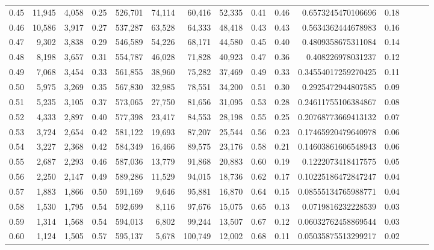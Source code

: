 \begin{tabular}{rrrrrrrrrrrrrrr}
0.45 &  11,945 &  4,058 &  0.25 &  526,701 &   74,114 &   60,416 &   52,335 &  0.41 &  0.46 &      0.6573245470106696 &      0.18 \\
0.46 &  10,586 &  3,917 &  0.27 &  537,287 &   63,528 &   64,333 &   48,418 &  0.43 &  0.43 &      0.5634362444678983 &      0.16 \\
0.47 &   9,302 &  3,838 &  0.29 &  546,589 &   54,226 &   68,171 &   44,580 &  0.45 &  0.40 &      0.4809358675311084 &      0.14 \\
0.48 &   8,198 &  3,657 &  0.31 &  554,787 &   46,028 &   71,828 &   40,923 &  0.47 &  0.36 &       0.408226978031237 &      0.12 \\
0.49 &   7,068 &  3,454 &  0.33 &  561,855 &   38,960 &   75,282 &   37,469 &  0.49 &  0.33 &     0.34554017259270425 &      0.11 \\
0.50 &   5,975 &  3,269 &  0.35 &  567,830 &   32,985 &   78,551 &   34,200 &  0.51 &  0.30 &      0.2925472944807585 &      0.09 \\
0.51 &   5,235 &  3,105 &  0.37 &  573,065 &   27,750 &   81,656 &   31,095 &  0.53 &  0.28 &     0.24611755106384867 &      0.08 \\
0.52 &   4,333 &  2,897 &  0.40 &  577,398 &   23,417 &   84,553 &   28,198 &  0.55 &  0.25 &     0.20768773669413132 &      0.07 \\
0.53 &   3,724 &  2,654 &  0.42 &  581,122 &   19,693 &   87,207 &   25,544 &  0.56 &  0.23 &     0.17465920479640978 &      0.06 \\
0.54 &   3,227 &  2,368 &  0.42 &  584,349 &   16,466 &   89,575 &   23,176 &  0.58 &  0.21 &     0.14603861606548943 &      0.06 \\
0.55 &   2,687 &  2,293 &  0.46 &  587,036 &   13,779 &   91,868 &   20,883 &  0.60 &  0.19 &      0.1222073418417575 &      0.05 \\
0.56 &   2,250 &  2,147 &  0.49 &  589,286 &   11,529 &   94,015 &   18,736 &  0.62 &  0.17 &     0.10225186472847247 &      0.04 \\
0.57 &   1,883 &  1,866 &  0.50 &  591,169 &    9,646 &   95,881 &   16,870 &  0.64 &  0.15 &     0.08555134765988771 &      0.04 \\
0.58 &   1,530 &  1,795 &  0.54 &  592,699 &    8,116 &   97,676 &   15,075 &  0.65 &  0.13 &      0.0719816232228539 &      0.03 \\
0.59 &   1,314 &  1,568 &  0.54 &  594,013 &    6,802 &   99,244 &   13,507 &  0.67 &  0.12 &     0.06032762458869544 &      0.03 \\
0.60 &   1,124 &  1,505 &  0.57 &  595,137 &    5,678 &  100,749 &   12,002 &  0.68 &  0.11 &     0.05035875513299217 &      0.02 \\

\end{tabular}
